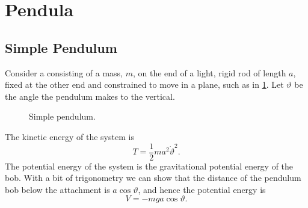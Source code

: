 \documentclass[fleqn]{NotesClass}
\begin{document}
    \section{Pendula}
    \subsection{Simple Pendulum}
    Consider a  consisting of a mass, \(m\), on the end of a light, rigid rod of length \(a\), fixed at the other end and constrained to move in a plane, such as in \cref{fig:simple pendulum}.
    Let \(\vartheta\) be the angle the pendulum makes to the vertical.
    
    \begin{figure}
        \caption{Simple pendulum.}
        \label{fig:simple pendulum}
    \end{figure}
    
    The kinetic energy of the system is
    \begin{equation}
        T = \frac{1}{2}ma^2\dot{\vartheta}^2.
    \end{equation}
    The potential energy of the system is the gravitational potential energy of the bob.
    With a bit of trigonometry we can show that the distance of the pendulum bob below the attachment is \(a\cos\vartheta\), and hence the potential energy is
    \begin{equation}
        V = -mga\cos\vartheta.
    \end{equation}
\end{document}
